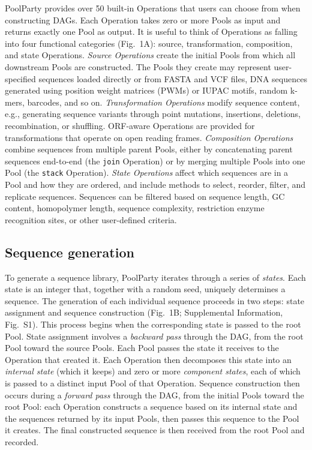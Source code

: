 \documentclass[pdflatex,sn-vancouver-num,referee,oneside]{sn-jnl}
\newif\ifshowquoted
\newcommand{\quoted}[1]{\ifshowquoted\textcolor{quotedtext}{#1}\else#1\fi}
\begin{document}
PoolParty provides over 50 built-in Operations that users can choose from when constructing DAGs. Each Operation takes zero or more Pools as input and returns exactly one Pool as output. It is useful to think of Operations as falling into four functional categories (Fig.~1A): source, transformation, composition, and state Operations. \emph{Source Operations} create the initial Pools from which all downstream Pools are constructed. The Pools they create may represent user-specified sequences loaded directly or from FASTA and VCF files, DNA sequences generated using position weight matrices (PWMs) or IUPAC motifs, random k-mers, barcodes, and so on. \emph{Transformation Operations} modify sequence content, e.g., generating sequence variants through point mutations, insertions, deletions, recombination, or shuffling. ORF-aware Operations are provided for transformations that operate on open reading frames. \emph{Composition Operations} combine sequences from multiple parent Pools, either by concatenating parent sequences end-to-end (the \texttt{join} Operation) or by merging multiple Pools into one Pool (the \texttt{stack} Operation). \emph{State Operations} affect which sequences are in a Pool and how they are ordered, and include methods to select, reorder, filter, and replicate sequences. \quoted{Sequences can be filtered based on sequence length, GC content, homopolymer length, sequence complexity, restriction enzyme recognition sites, or other user-defined criteria.}

\subsection*{Sequence generation}\label{subsec:sequence-generation}

To generate a sequence library, PoolParty iterates through a series of \emph{states}. Each state is an integer that, together with a random seed, uniquely determines a sequence. The generation of each individual sequence proceeds in two steps: state assignment and sequence construction (Fig.~1B; Supplemental Information, Fig.~S1). This process begins when the corresponding state is passed to the root Pool. State assignment involves a \emph{backward pass} through the DAG, from the root Pool toward the source Pools. Each Pool passes the state it receives to the Operation that created it. Each Operation then decomposes this state into an \emph{internal state} (which it keeps) and zero or more \emph{component states}, each of which is passed to a distinct input Pool of that Operation. Sequence construction then occurs during a \emph{forward pass} through the DAG, from the initial Pools toward the root Pool: each Operation constructs a sequence based on its internal state and the sequences returned by its input Pools, then passes this sequence to the Pool it creates. The final constructed sequence is then received from the root Pool and recorded.
\end{document}
